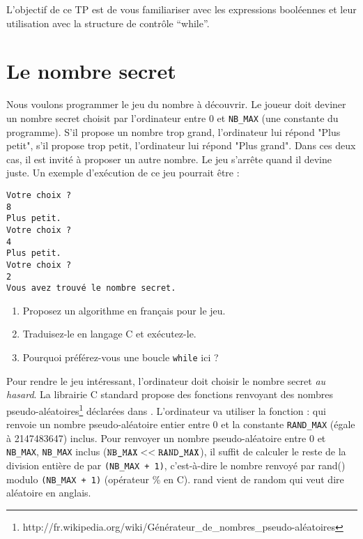 



\vspace{-1em}L'objectif de ce TP est de vous familiariser avec les expressions booléennes et leur utilisation avec la structure de contrôle ``while''.

\section{Le nombre secret}

Nous voulons programmer le jeu du nombre à découvrir. Le joueur doit
deviner un nombre secret choisit par l'ordinateur entre 0 et \verb|NB_MAX| (une constante du programme). S'il propose un nombre trop
grand, l'ordinateur lui répond "Plus petit", s'il propose trop petit, l'ordinateur lui répond "Plus grand". Dans ces deux cas, il
est invité à proposer un autre nombre. Le jeu s'arrête quand il devine juste.
Un exemple d'exécution de ce jeu pourrait être :
\begin{verbatim}
Votre choix ?
8
Plus petit.
Votre choix ?
4
Plus petit.
Votre choix ?
2
Vous avez trouvé le nombre secret.
\end{verbatim}

\begin{enumerate}
\item Proposez un algorithme en français pour le jeu.
\item Traduisez-le en langage C et exécutez-le.
\item Pourquoi préférez-vous une boucle \verb|while| ici ?
\end{enumerate}

Pour rendre le jeu intéressant, l'ordinateur doit choisir le nombre secret \emph{au hasard}. La librairie C standard propose des fonctions renvoyant des nombres pseudo-aléatoires\footnote{http://fr.wikipedia.org/wiki/Générateur\_de\_nombres\_pseudo-aléatoires} déclarées dans . L'ordinateur va utiliser la fonction :
qui renvoie un nombre pseudo-aléatoire entier entre 0 et la constante
\verb|RAND_MAX| (égale à 2147483647) inclus. Pour renvoyer un nombre
pseudo-aléatoire entre 0 et \verb|NB_MAX|, \verb|NB_MAX| inclus
($\verb|NB_MAX| << \verb|RAND_MAX|$), il suffit de calculer le reste
de la division entière de  par \verb|(NB_MAX + 1)|,
c'est-à-dire le nombre renvoyé par rand()  modulo \verb|(NB_MAX + 1)|
(opérateur \% en C). rand vient de random qui veut dire aléatoire en anglais.

